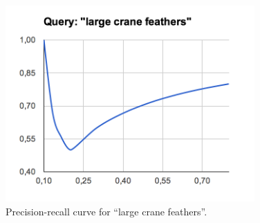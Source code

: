 \documentclass[11pt,a4paper]{article}
\begin{document}
      \begin{figure}[h]
        \includegraphics[width=0.85\textwidth]{imgs/large_crane_feathers_pr}
        \caption{Precision-recall curve for ``large crane feathers''.}
        \label{fig:pr3}
      \end{figure}


\end{document}
